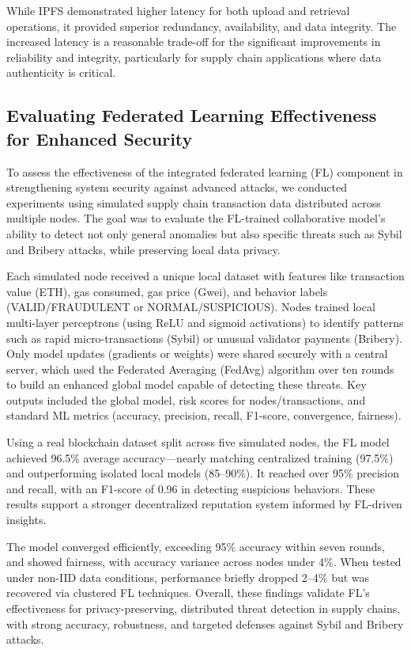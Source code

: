\documentclass[conference]{IEEEtran}
\begin{document}
While IPFS demonstrated higher latency for both upload and retrieval operations, it provided superior redundancy, availability, and data integrity. The increased latency is a reasonable trade-off for the significant improvements in reliability and integrity, particularly for supply chain applications where data authenticity is critical.

\subsection{Evaluating Federated Learning Effectiveness for Enhanced Security}

To assess the effectiveness of the integrated federated learning (FL) component in strengthening system security against advanced attacks, we conducted experiments using simulated supply chain transaction data distributed across multiple nodes. The goal was to evaluate the FL-trained collaborative model’s ability to detect not only general anomalies but also specific threats such as Sybil and Bribery attacks, while preserving local data privacy.

Each simulated node received a unique local dataset with features like transaction value (ETH), gas consumed, gas price (Gwei), and behavior labels (VALID/FRAUDULENT or NORMAL/SUSPICIOUS). Nodes trained local multi-layer perceptrons (using ReLU and sigmoid activations) to identify patterns such as rapid micro-transactions (Sybil) or unusual validator payments (Bribery). Only model updates (gradients or weights) were shared securely with a central server, which used the Federated Averaging (FedAvg) algorithm over ten rounds to build an enhanced global model capable of detecting these threats. Key outputs included the global model, risk scores for nodes/transactions, and standard ML metrics (accuracy, precision, recall, F1-score, convergence, fairness).

Using a real blockchain dataset split across five simulated nodes, the FL model achieved 96.5\% average accuracy—nearly matching centralized training (97.5\%) and outperforming isolated local models (85--90\%). It reached over 95\% precision and recall, with an F1-score of 0.96 in detecting suspicious behaviors. These results support a stronger decentralized reputation system informed by FL-driven insights.

The model converged efficiently, exceeding 95\% accuracy within seven rounds, and showed fairness, with accuracy variance across nodes under 4\%. When tested under non-IID data conditions, performance briefly dropped 2--4\% but was recovered via clustered FL techniques. Overall, these findings validate FL’s effectiveness for privacy-preserving, distributed threat detection in supply chains, with strong accuracy, robustness, and targeted defenses against Sybil and Bribery attacks.
\end{document}
